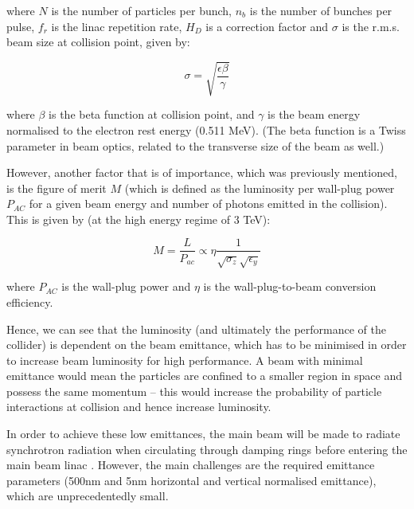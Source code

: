 where $N$ is the number of particles per bunch, $n_b$ is the number of bunches per pulse, $f_r$ is the linac repetition rate, $H_D$ is a correction factor and $\sigma$ is the r.m.s. beam size at collision point, given by:

\begin{equation}
    \sigma = \sqrt{\frac{\epsilon \beta}{\gamma}}
\end{equation}


where $\beta$ is the beta function at collision point, and $\gamma$ is the beam energy normalised to the electron rest energy (0.511 MeV). (The beta function is a Twiss parameter in beam optics, related to the transverse size of the beam as well.)

However, another factor that is of importance, which was previously mentioned, is the figure of merit $M$ (which is defined as the luminosity per wall-plug power $P_{AC}$ for a given beam energy and number of photons emitted in the collision). This is given by (at the high energy regime of 3 TeV):

\begin{equation}
    M = \frac{L}{P_{ac}} \propto \eta \frac{1}{\sqrt{\sigma_z}\sqrt{\epsilon_y}}
\end{equation}


where $P_{AC}$ is the wall-plug power and $\eta$ is the wall-plug-to-beam conversion efficiency.

Hence, we can see that the luminosity (and ultimately the performance of the collider) is dependent on the beam emittance, which has to be minimised in order to increase beam luminosity for high performance. A beam with minimal emittance would mean the particles are confined to a smaller region in space and possess the same momentum – this would increase the probability of particle interactions at collision and hence increase luminosity.

In order to achieve these low emittances, the main beam will be made to radiate synchrotron radiation when circulating through damping rings before entering the main beam linac \cite{CLIC:Concept}. However, the main challenges are the required emittance parameters (500nm and 5nm horizontal and vertical normalised emittance), which are unprecedentedly small.

